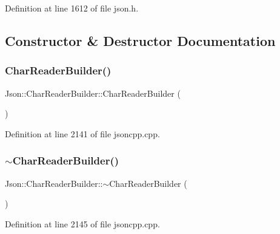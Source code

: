 Definition at line 1612 of file json.\+h.



\subsection{Constructor \& Destructor Documentation}
\hypertarget{class_json_1_1_char_reader_builder_a6e197b69a2ede3d87b03b9c5c78ba46a}{}\label{class_json_1_1_char_reader_builder_a6e197b69a2ede3d87b03b9c5c78ba46a} 
\subsubsection{\texorpdfstring{Char\+Reader\+Builder()}{CharReaderBuilder()}\hspace{0.1cm}{\footnotesize\ttfamily [1/2]}}
{\footnotesize\ttfamily Json\+::\+Char\+Reader\+Builder\+::\+Char\+Reader\+Builder (\begin{DoxyParamCaption}{ }\end{DoxyParamCaption})}



Definition at line 2141 of file jsoncpp.\+cpp.

\hypertarget{class_json_1_1_char_reader_builder_ae8226503f5b947e9d618c39dd992c85c}{}\label{class_json_1_1_char_reader_builder_ae8226503f5b947e9d618c39dd992c85c} 
\subsubsection{\texorpdfstring{$\sim$\+Char\+Reader\+Builder()}{~CharReaderBuilder()}\hspace{0.1cm}{\footnotesize\ttfamily [1/2]}}
{\footnotesize\ttfamily Json\+::\+Char\+Reader\+Builder\+::$\sim$\+Char\+Reader\+Builder (\begin{DoxyParamCaption}{ }\end{DoxyParamCaption})}



Definition at line 2145 of file jsoncpp.\+cpp.

